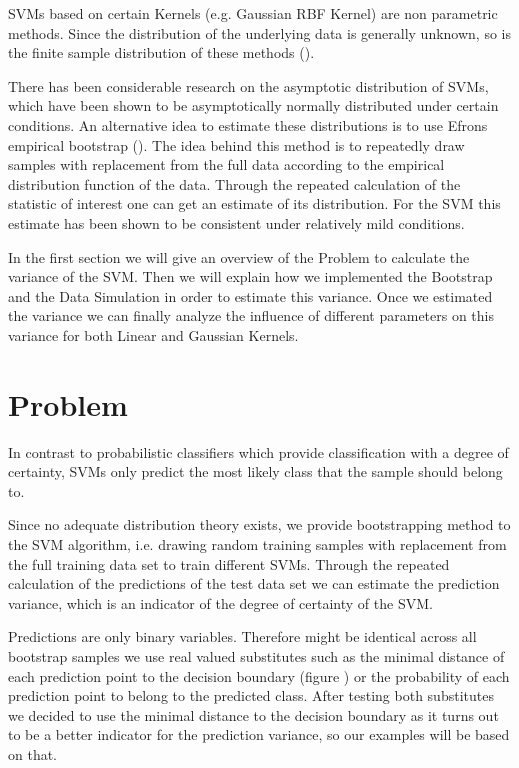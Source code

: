 \documentclass[a4paper]{article}
\begin{document}
SVMs based on certain Kernels (e.g. Gaussian RBF Kernel) are non parametric methods. Since the distribution of the underlying data is generally unknown, so is the finite sample distribution of these methods (\cite{hastie_elements_2005}).

There has been considerable research on the asymptotic distribution of SVMs, which have been shown to be asymptotically normally distributed under certain conditions. An alternative idea to estimate these distributions is to use Efrons empirical bootstrap (\cite{efron_introduction_1994}). The idea behind this method is to repeatedly draw samples with replacement from the full data according to the empirical distribution function of the data. Through the repeated calculation of the statistic of interest one can get an estimate of its distribution. For the SVM this estimate has been shown to be consistent under relatively mild conditions.
    
In the first section we will give an overview of the Problem to calculate the variance of the SVM. Then we will explain how we implemented the Bootstrap and the Data Simulation in order to estimate this variance. Once we estimated the variance we can finally analyze the influence of different parameters on this variance for both Linear and Gaussian Kernels.

\section{Problem}
In contrast to probabilistic classifiers which provide classification with a degree of certainty, SVMs only predict the most likely class that the sample should belong to.  

Since no adequate distribution theory exists, we provide bootstrapping method to the SVM algorithm, i.e. drawing random training samples with replacement from the full training data set to train different SVMs. Through the repeated calculation of the predictions of the test data set we can estimate the prediction variance, which is an indicator of the degree of certainty of the SVM. 

Predictions are only binary variables. Therefore might be identical across all bootstrap samples we use real valued substitutes such as the minimal distance of each prediction point to the decision boundary (figure \label{fig1}) or the probability of each prediction point to belong to the predicted class. After testing both substitutes we decided to use the minimal distance to the decision boundary as it turns out to be a better indicator for the prediction variance, so our examples will be based on that. 
\end{document}

